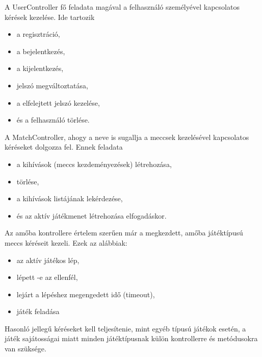 A UserController fő feladata magával a felhasználó személyével kapcsolatos kérések kezelése. Ide tartozik
\begin{itemize}
	\item a regisztráció,
	\item a bejelentkezés,
	\item a kijelentkezés,
	\item jelszó megváltoztatása,
	\item a elfelejtett jelszó kezelése,
	\item és a felhasználó törlése.
\end{itemize}

A MatchController, ahogy a neve is sugallja a meccsek kezelésével kapcsolatos kéréseket dolgozza fel. Ennek feladata
\begin{itemize}
	\item a kihívások (meccs kezdeményezések) létrehozása,
	\item törlése,
	\item a kihívások listájának lekérdezése,
	\item és az aktív játékmenet létrehozása elfogadáskor.
\end{itemize}

Az amőba kontrollere értelem szerűen már a megkezdett, amőba játéktípusú meccs kéréseit kezeli. Ezek az alábbiak:
\begin{itemize}
	\item az aktív játékos lép,
	\item lépett -e az ellenfél,
	\item lejárt a lépéshez megengedett idő (timeout),
	\item játék feladása
\end{itemize}

Hasonló jellegű kéréseket kell teljesítenie, mint egyéb típusú játékok esetén, a játék sajátosságai miatt minden játéktípusnak külön kontrollerre és metódusokra van szüksége.




